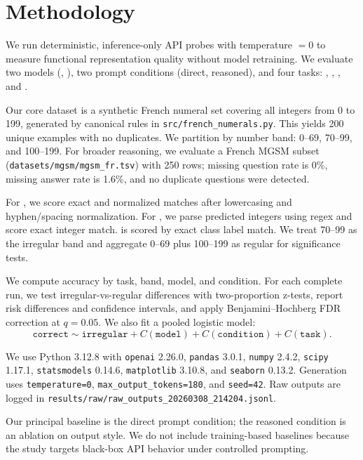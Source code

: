 \section{Methodology}
\label{sec:methodology}
We run deterministic, inference-only API probes with temperature $=0$ to measure functional representation quality without model retraining. We evaluate two models (\gptfourone, \gptfouronemini), two prompt conditions (direct, reasoned), and four tasks: \digitword, \worddigit, \patterncls, and \mgsmfr.

Our core dataset is a synthetic French numeral set covering all integers from 0 to 199, generated by canonical rules in \texttt{src/french\_numerals.py}. This yields 200 unique examples with no duplicates. We partition by number band: 0--69, 70--99, and 100--199. For broader reasoning, we evaluate a French MGSM subset (\texttt{datasets/mgsm/mgsm\_fr.tsv}) with 250 rows; missing question rate is 0\%, missing answer rate is 1.6\%, and no duplicate questions were detected.

For \digitword, we score exact and normalized matches after lowercasing and hyphen/spacing normalization. For \worddigit, we parse predicted integers using regex and score exact integer match. \patterncls is scored by exact class label match. We treat 70--99 as the irregular band and aggregate 0--69 plus 100--199 as regular for significance tests.

We compute accuracy by task, band, model, and condition. For each complete run, we test irregular-vs-regular differences with two-proportion z-tests, report risk differences and confidence intervals, and apply Benjamini--Hochberg FDR correction at $q=0.05$. We also fit a pooled logistic model:
\[
\texttt{correct} \sim \texttt{irregular} + C(\texttt{model}) + C(\texttt{condition}) + C(\texttt{task}).
\]

We use Python 3.12.8 with \texttt{openai} 2.26.0, \texttt{pandas} 3.0.1, \texttt{numpy} 2.4.2, \texttt{scipy} 1.17.1, \texttt{statsmodels} 0.14.6, \texttt{matplotlib} 3.10.8, and \texttt{seaborn} 0.13.2. Generation uses \texttt{temperature=0}, \texttt{max\_output\_tokens=180}, and \texttt{seed=42}. Raw outputs are logged in \texttt{results/raw/raw\_outputs\_20260308\_214204.jsonl}.

Our principal baseline is the direct prompt condition; the reasoned condition is an ablation on output style. We do not include training-based baselines because the study targets black-box API behavior under controlled prompting.
